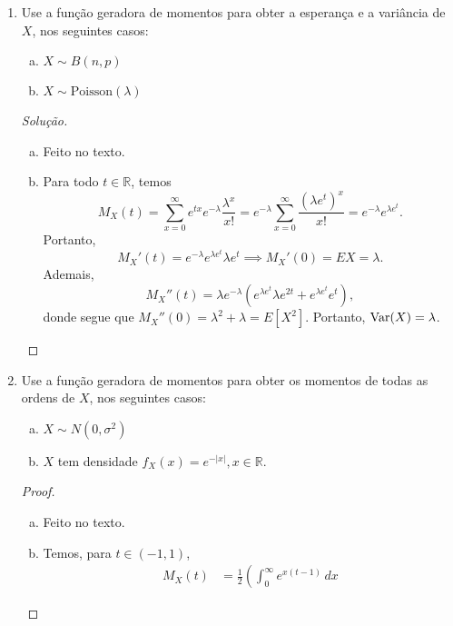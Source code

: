 \documentclass[../Notas.tex]{subfiles}
\begin{document}
\begin{enumerate}
\begin{proof}[Solução]
\[        \]
    \end{proof}
    \item Use a função geradora de momentos para obter a esperança e a variância de $X$, nos seguintes casos:
    \begin{enumerate}[a)]
    \item $X\sim B(n, p)$ 
    \item $X\sim\text{Poisson}(\lambda)$
    \end{enumerate}
    \begin{proof}[Solução]
        \begin{enumerate}[a)]
            \item Feito no texto.
            \item Para todo $t\in\mathbb{R}$, temos
            \[
            M_X(t) = \sum_{x=0}^{\infty} e^{tx}e^{-\lambda}\frac{\lambda^x}{x!}
                   = e^{-\lambda} \sum_{x=0}^{\infty}\frac{(\lambda e^t)^x}{x!}
                   = e^{-\lambda}e^{\lambda e^t}.
            \]
            Portanto,
            \[
            M_X'(t) = e^{-\lambda}e^{\lambda e^t}\lambda e^{t}
            \implies M_X'(0) = EX = \lambda.
            \]
            Ademais,
            \[
            M_X''(t) = \lambda e^{-\lambda}(e^{\lambda e^t}\lambda e^{2t} 
            + e^{\lambda e^t}e^t),
            \]
            donde segue que $M_X''(0) = \lambda^2 + \lambda = E[X^2]$. Portanto,
            $\text{Var}(X) = \lambda$.
        \end{enumerate}
    \end{proof}
    \item Use a função geradora de momentos para obter os momentos de todas as ordens de $X$, nos seguintes casos:
    \begin{enumerate}[a)]
    \item $X\sim N(0,\sigma^2)$ 
    \item $X$ tem densidade $f_X(x) = e^{-|x|}, x \in\mathbb{R}$.
    \end{enumerate}
    \begin{proof}
        \begin{enumerate}[a)]
            \item Feito no texto.
            \item Temos, para $t\in(-1,1)$,
            \begin{align*}
                M_X(t) &= \frac{1}{2}\left( \int_0^{\infty} e^{x(t-1)} \, dx

\end{align*}
\end{enumerate}
\end{proof}
\end{enumerate}
\end{document}

